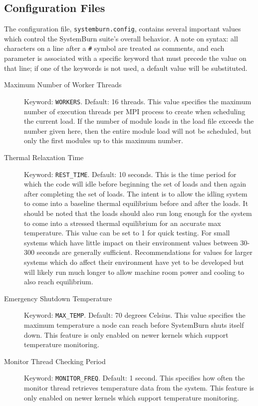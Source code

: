 \subsection{Configuration Files}

The configuration file, \verb!systemburn.config!, contains several
important values which control the SystemBurn suite's overall behavior. A
note on syntax: all characters on a line after a \verb!#! symbol are
treated as comments, and each parameter is associated with a specific
keyword that must precede the value on that line; if one of the keywords
is not used, a default value will be substituted.

\begin{description}

	\item[Maximum Number of Worker Threads] Keyword:
	\verb!WORKERS!. Default: 16 threads. This value specifies the
	maximum number of execution threads per MPI process to create
	when scheduling the current load. If the number of module loads
	in the load file exceeds the number given here, then the entire
	module load will not be scheduled, but only the first modules
	up to this maximum number.

	\item[Thermal Relaxation Time] Keyword:
	\verb!REST_TIME!. Default: 10 seconds.
	This is the time period for which the code will idle before
	beginning the set of loads and then again after completing the
	set of loads. The intent is to allow the idling system to 
	come into a baseline thermal equilibrium before and after the 
	loads. It should be noted that the loads should also run long
	enough for the system to come into a stressed thermal equilibrium
	for an accurate max temperature.
	This value can be set to 1 for quick testing.
	For small systems which have little impact on their environment
	values between 30-300 seconds are generally sufficient.
	Recommendations for values for larger systems which do
	affect their environment have yet to be developed but will likely
	run much longer to allow machine room power and cooling to also
	reach equilibrium.

	\item[Emergency Shutdown Temperature] Keyword: \verb!MAX_TEMP!. Default:
	70 degrees Celsius. This value specifies the maximum temperature
	a node can reach before SystemBurn shuts itself down. This feature is 
	only enabled on newer kernels which support temperature monitoring.

	\item[Monitor Thread Checking Period] Keyword:
	\verb!MONITOR_FREQ!. Default: 1 second. This specifies how often
	the monitor thread retrieves temperature data from the system.
	This feature is only enabled on newer kernels which support
	temperature monitoring.


\end{description}
